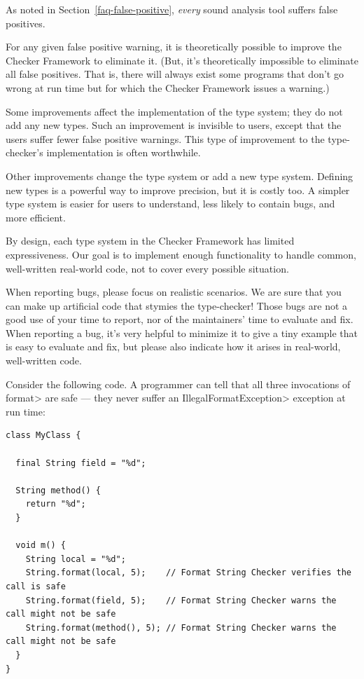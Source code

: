 
As noted in Section~\ref{faq-false-positive}, \emph{every} sound analysis
tool suffers false positives.

For any given false positive warning, it is theoretically possible to
improve the Checker Framework to eliminate it.  (But, it's theoretically
impossible to eliminate all false positives.  That is, there
will always exist some programs that don't go wrong at run time but for
which the Checker Framework issues a warning.)

Some improvements affect the implementation of the type system; they do not
add any new types.  Such an improvement is invisible to users, except that
the users suffer fewer false positive warnings.  This type of improvement
to the type-checker's implementation is often worthwhile.

Other improvements change the type system or add a new type system.
Defining new types is a powerful way to improve precision, but it is costly
too.  A simpler type system is easier for users to understand, less likely
to contain bugs, and more efficient.

By design, each type system in the Checker Framework has limited
expressiveness.  Our goal is to implement enough functionality to handle
common, well-written real-world code, not to cover every possible
situation.

When reporting bugs, please focus on realistic scenarios.  We are sure that
you can make up artificial code that stymies the type-checker!  Those bugs
are not a good use of your time to report, nor of the maintainers' time to
evaluate and fix.  When reporting a bug, it's very helpful to minimize it
to give a tiny example that is easy to evaluate and fix, but please also
indicate how it arises in real-world, well-written code.



Consider the following code.  A programmer can tell that all three
invocations of \<format> are safe --- they never suffer an
\<IllegalFormatException> exception at run time:

\begin{Verbatim}
class MyClass {

  final String field = "%d";

  String method() {
    return "%d";
  }

  void m() {
    String local = "%d";
    String.format(local, 5);    // Format String Checker verifies the call is safe
    String.format(field, 5);    // Format String Checker warns the call might not be safe
    String.format(method(), 5); // Format String Checker warns the call might not be safe
  }
}
\end{Verbatim}

